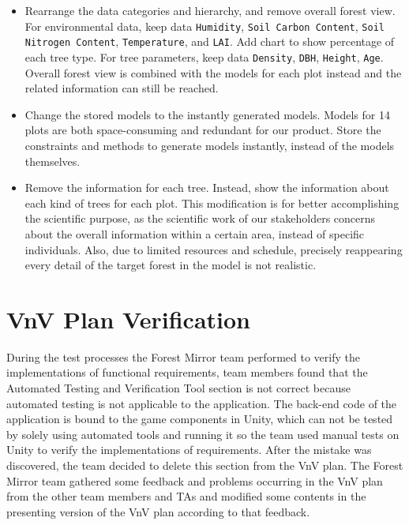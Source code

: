 \documentclass[12pt, titlepage]{article}
\begin{document}
\begin{itemize}
    \item Rearrange the data categories and hierarchy, and remove overall forest view. For environmental data, keep data \verb|Humidity|, \verb|Soil Carbon Content|, \verb|Soil Nitrogen Content|, \verb|Temperature|, and \verb|LAI|. Add chart to show percentage of each tree type. For tree parameters, keep data \verb|Density|, \verb|DBH|, \verb|Height|, \verb|Age|. Overall forest view is combined with the models for each plot instead and the related information can still be reached.

    \item Change the stored models to the instantly generated models. Models for 14 plots are both space-consuming and redundant for our product. Store the constraints and methods to generate models instantly, instead of the models themselves.
 

    \item Remove the information for each tree. Instead, show the information about each kind of trees for each plot. This modification is for better accomplishing the scientific purpose, as the scientific work of our stakeholders concerns about the overall information within a certain area, instead of specific individuals. Also, due to limited resources and schedule, precisely reappearing every detail of the target forest in the model is not realistic. 

    
\end{itemize}


\section{VnV Plan Verification}
During the test processes the Forest Mirror team performed to verify the implementations of functional requirements, team members found that the Automated Testing and Verification Tool section is not correct because automated testing is not applicable to the application. The back-end code of the application is bound to the game components in Unity, which can not be tested by solely using automated tools and running it so the team used manual tests on Unity to verify the implementations of requirements. After the mistake was discovered, the team decided to delete this section from the VnV plan.
The Forest Mirror team gathered some feedback and problems occurring in the VnV plan from the other team members and TAs and modified some contents in the presenting version of the VnV plan according to that feedback.  
\end{document}
